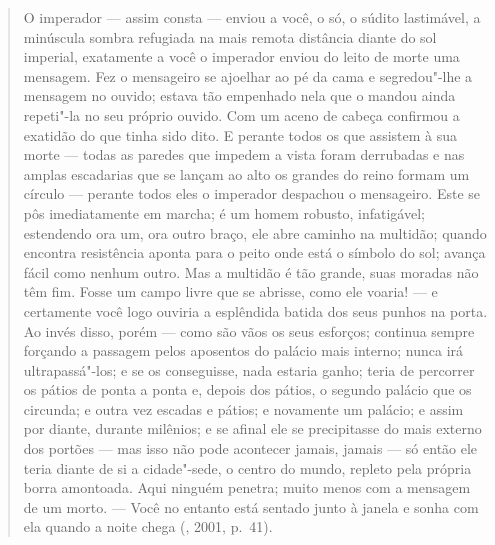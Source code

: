 \begin{quote}
\forceindent{}

O imperador --- assim consta --- enviou a você, o só, o súdito lastimável,
a minúscula sombra refugiada na mais remota distância diante do sol
imperial, exatamente a você o imperador enviou do leito de morte uma
mensagem. Fez o mensageiro se ajoelhar ao pé da cama e segredou"-lhe a
mensagem no ouvido; estava tão empenhado nela que o mandou ainda
repeti"-la no seu próprio ouvido. Com um aceno de cabeça confirmou a
exatidão do que tinha sido dito. E perante todos os que assistem à sua
morte --- todas as paredes que impedem a vista foram derrubadas e nas
amplas escadarias que se lançam ao alto os grandes do reino formam um
círculo --- perante todos eles o imperador despachou o mensageiro. Este
se pôs imediatamente em marcha; é um homem robusto, infatigável;
estendendo ora um, ora outro braço, ele abre caminho na multidão; quando
encontra resistência aponta para o peito onde está o símbolo do sol;
avança fácil como nenhum outro. Mas a multidão é tão grande, suas
moradas não têm fim. Fosse um campo livre que se abrisse, como ele
voaria! --- e certamente você logo ouviria a esplêndida batida dos seus
punhos na porta. Ao invés disso, porém --- como são vãos os seus
esforços; continua sempre forçando a passagem pelos aposentos do palácio
mais interno; nunca irá ultrapassá"-los; e se os conseguisse, nada
estaria ganho; teria de percorrer os pátios de ponta a ponta e, depois
dos pátios, o segundo palácio que os circunda; e outra vez escadas e
pátios; e novamente um palácio; e assim por diante, durante milênios; e
se afinal ele se precipitasse do mais externo dos portões --- mas isso
não pode acontecer jamais, jamais --- só então ele teria diante de si a
cidade"-sede, o centro do mundo, repleto pela própria borra amontoada.
Aqui ninguém penetra; muito menos com a mensagem de um morto. --- Você no
entanto está sentado junto à janela e sonha com ela quando a noite
chega (, 2001, p.~41).
\end{quote}

